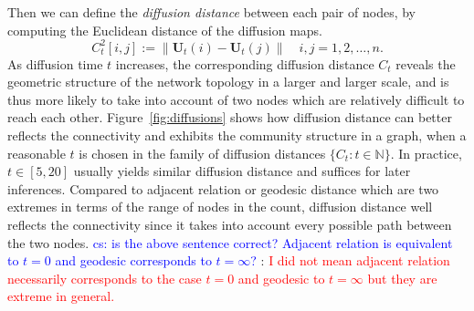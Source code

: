 \documentclass[11pt]{article}
\theoremstyle{definition}
\newcommand{\cs}[1]{\textcolor{blue}{cs: #1}}
\begin{document}
Then we can define the \textit{diffusion distance} between each pair of nodes, by computing the Euclidean distance of the diffusion maps. 
\begin{equation}
\label{eq:diffusion}
C^2_{t}[i,j]  :=   \parallel \mathbf{U}_{t}(i) - \mathbf{U}_{t}(j) \parallel   \quad i,j = 1,2, \ldots , n.
\end{equation}
As diffusion time $t$ increases, the corresponding diffusion distance $C_{t}$ reveals the geometric structure of the network topology in a larger and larger scale, and is thus more likely to take into account of two nodes which are relatively difficult to reach each other. Figure~\ref{fig:diffusions} shows how diffusion distance can better reflects the connectivity and exhibits the community structure in a graph, when a reasonable $t$ is chosen in the family of diffusion distances $\{ C_{t} : t \in \mathbb{N} \}$. In practice, $t \in [5,20]$ usually yields similar diffusion distance and suffices for later inferences. Compared to adjacent relation or geodesic distance which are two extremes in terms of the range of nodes in the count, diffusion distance well reflects the connectivity since it takes into account every possible path between the two nodes. 
\cs{is the above sentence correct? Adjacent relation is equivalent to $t=0$ and geodesic corresponds to $t=\infty$?} : \textcolor{red}{I did not mean adjacent relation necessarily corresponds to the case $t=0$ and geodesic to $t = \infty$ but they are extreme in general.}
\end{document}

